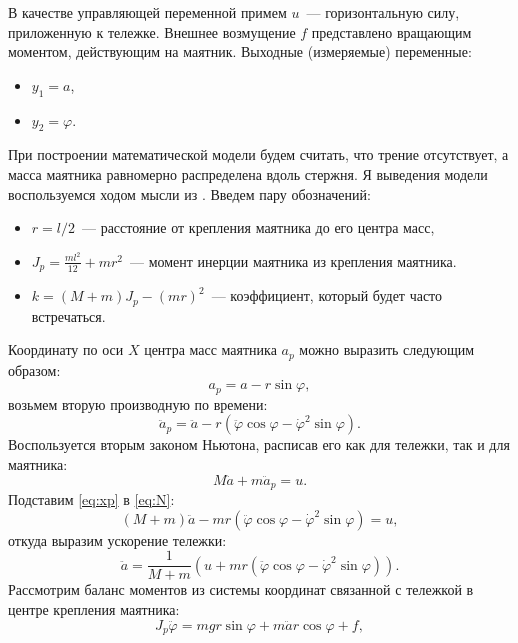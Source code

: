 В качестве управляющей переменной примем $u$~--- горизонтальную силу,
 приложенную к тележке. Внешнее возмущение $f$ представлено вращающим 
 моментом, действующим на маятник. Выходные (измеряемые) переменные:
\begin{itemize}
    \item $y_1 = a$,\
    \item $y_2 = \varphi$.
\end{itemize}

При построении математической модели будем считать, что трение отсутствует, 
а масса маятника равномерно распределена вдоль стержня.
Я выведения модели воспользуемся ходом мысли из \cite{pendulum_cart}.
Введем пару обозначений:
\begin{itemize}
    \item $r = l/2$~--- расстояние от крепления маятника до его центра масс,
    \item $J_p = \frac{ml^2}{12}+mr^2$~--- момент инерции маятника из крепления маятника.
    \item $k=(M+m)J_p-(mr)^2$~--- коэффициент, который будет часто встречаться.
\end{itemize}
Координату по оси $X$ центра масс маятника $a_p$ можно выразить следующим образом:
\begin{equation*}
    a_p=a-r\sin\varphi,
\end{equation*}
возьмем вторую производную по времени:
\begin{equation}
    \label{eq:xp}
    \ddot a_p=\ddot a-r(\ddot\varphi\cos\varphi-\dot\varphi^2\sin\varphi).
\end{equation}
Воспользуется вторым законом Ньютона, расписав его как для тележки, так и для маятника:
\begin{equation}
    \label{eq:N}
    M\ddot a+m\ddot a_p=u.
\end{equation}
Подставим \eqref{eq:xp} в \eqref{eq:N}:
\begin{equation*}
    (M+m)\ddot a-mr(\ddot\varphi\cos\varphi-\dot\varphi^2\sin\varphi)=u,
\end{equation*}
откуда выразим ускорение тележки:
\begin{equation}
    \label{eq:x}
    \ddot a=\frac{1}{M+m}(u+mr(\ddot\varphi\cos\varphi-\dot\varphi^2\sin\varphi)).
\end{equation}
Рассмотрим баланс моментов из системы координат связанной с тележкой в центре крепления маятника:
\begin{equation*}
    J_p\ddot\varphi=mgr\sin\varphi+m\ddot ar\cos\varphi+f,
\end{equation*}
